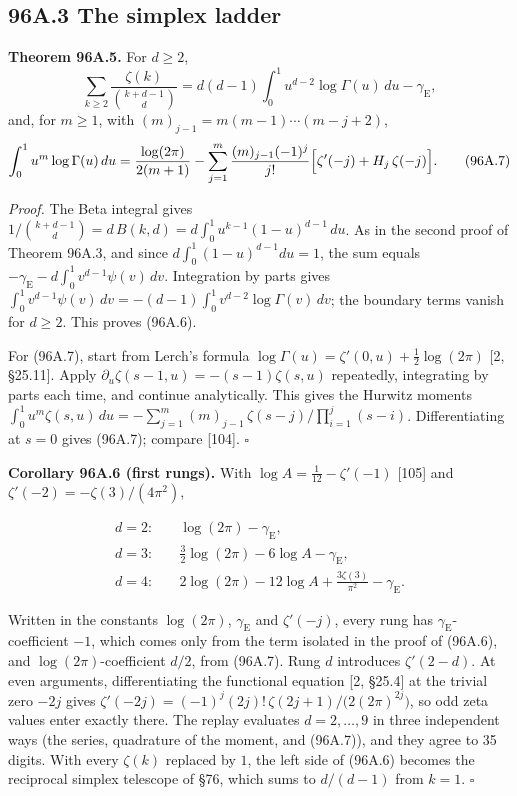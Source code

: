 \documentclass[
  11pt,
]{book}
\renewenvironment{quote}
  {\begin{tcolorbox}[
      enhanced,
      breakable,
      colback=tncream,
      colframe=tnrust,
      boxrule=0.8pt,
      arc=1.5pt,
      left=7pt,
      right=7pt,
      top=6pt,
      bottom=6pt]}
  {\end{tcolorbox}}
\begin{document}
\subsection{96A.3 The simplex ladder}\label{a.3-the-simplex-ladder}

\begin{quote}
\textbf{Theorem 96A.5.} For \(d\ge2\), \[
\sum_{k\ge2}\frac{\zeta(k)}{\binom{k+d-1}d}
=d(d-1)\int_0^1u^{d-2}\log\Gamma(u)\,du-\gamma_{\mathrm E},
\tag{96A.6}
\] and, for \(m\ge1\), with \((m)_{j-1}=m(m-1)\cdots(m-j+2)\), \[
\int_0^1u^m\log\Gamma(u)\,du=\frac{\log(2\pi)}{2(m+1)}
-\sum_{j=1}^m\frac{(m)_{j-1}(-1)^j}{j!}\Bigl[\zeta'(-j)+H_j\,\zeta(-j)\Bigr].
\tag{96A.7}
\]
\end{quote}

\emph{Proof.} The Beta integral gives
\(1/\binom{k+d-1}d=d\,B(k,d)=d\int_0^1u^{k-1}(1-u)^{d-1}\,du\). As in
the second proof of Theorem 96A.3, and since
\(d\int_0^1(1-u)^{d-1}du=1\), the sum equals
\(-\gamma_{\mathrm E}-d\int_0^1v^{d-1}\psi(v)\,dv\). Integration by
parts gives
\(\int_0^1v^{d-1}\psi(v)\,dv=-(d-1)\int_0^1v^{d-2}\log\Gamma(v)\,dv\);
the boundary terms vanish for \(d\ge2\). This proves (96A.6).

For (96A.7), start from Lerch's formula
\(\log\Gamma(u)=\zeta'(0,u)+\tfrac12\log(2\pi)\) {[}2, §25.11{]}. Apply
\(\partial_u\zeta(s-1,u)=-(s-1)\zeta(s,u)\) repeatedly, integrating by
parts each time, and continue analytically. This gives the Hurwitz
moments
\(\int_0^1u^m\zeta(s,u)\,du=-\sum_{j=1}^m(m)_{j-1}\,\zeta(s-j)/\prod_{i=1}^{j}(s-i)\).
Differentiating at \(s=0\) gives (96A.7); compare {[}104{]}. \(\square\)

\textbf{Corollary 96A.6 (first rungs).} With
\(\log A=\tfrac1{12}-\zeta'(-1)\) {[}105{]} and
\(\zeta'(-2)=-\zeta(3)/(4\pi^2)\),

\[
\begin{aligned}
d=2:&\quad \log(2\pi)-\gamma_{\mathrm E},\\
d=3:&\quad \tfrac32\log(2\pi)-6\log A-\gamma_{\mathrm E},\\
d=4:&\quad 2\log(2\pi)-12\log A+\frac{3\zeta(3)}{\pi^2}-\gamma_{\mathrm E}.
\end{aligned}
\tag{96A.8}
\]

Written in the constants \(\log(2\pi)\), \(\gamma_{\mathrm E}\) and
\(\zeta'(-j)\), every rung has \(\gamma_{\mathrm E}\)-coefficient
\(-1\), which comes only from the term isolated in the proof of (96A.6),
and \(\log(2\pi)\)-coefficient \(d/2\), from (96A.7). Rung \(d\)
introduces \(\zeta'(2-d)\). At even arguments, differentiating the
functional equation {[}2, §25.4{]} at the trivial zero \(-2j\) gives
\(\zeta'(-2j)=(-1)^j(2j)!\,\zeta(2j+1)/\bigl(2(2\pi)^{2j}\bigr)\), so
odd zeta values enter exactly there. The replay evaluates
\(d=2,\ldots,9\) in three independent ways (the series, quadrature of
the moment, and (96A.7)), and they agree to 35 digits. With every
\(\zeta(k)\) replaced by \(1\), the left side of (96A.6) becomes the
reciprocal simplex telescope of §76, which sums to \(d/(d-1)\) from
\(k=1\). \(\square\)
\end{document}
